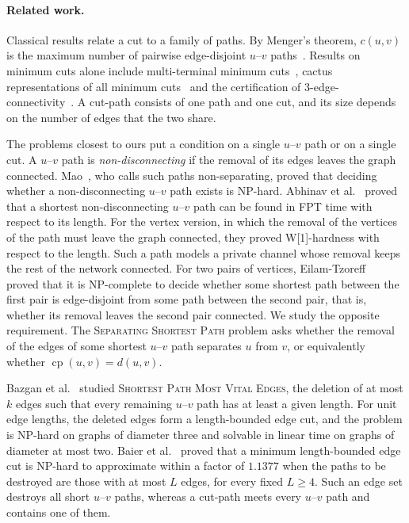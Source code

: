 \documentclass[a4paper,fleqn]{cas-sc}
\numberwithin{equation}{section}
\theoremstyle{definition}
\theoremstyle{plain}
\theoremstyle{remark}
\newcommand{\cp}{\operatorname{cp}}                  %
\newcommand{\SSP}{\textsc{Separating Shortest Path}}
\begin{document}
\paragraph{Related work.}
Classical results relate a cut to a family of paths.
By Menger's theorem, $c(u,v)$ is the maximum number of pairwise edge-disjoint $u$--$v$ paths~\cite[Corollary~3.3.5]{Diestel2025}.
Results on minimum cuts alone include multi-terminal minimum cuts~\cite{GomoryHu1961}, cactus representations of all minimum cuts~\cite{NagamochiKameda1996} and the certification of 3-edge-connectivity~\cite{Mehlhorn2017Certifying}.
A cut-path consists of one path and one cut, and its size depends on the number of edges that the two share.

The problems closest to ours put a condition on a single $u$--$v$ path or on a single cut.
A $u$--$v$ path is \emph{non-disconnecting} if the removal of its edges leaves the graph connected.
Mao~\cite{Mao2021NonSeparating}, who calls such paths non-separating, proved that deciding whether a non-disconnecting $u$--$v$ path exists is NP-hard.
Abhinav et al.~\cite{Abhinav2022NonSeparating} proved that a shortest non-disconnecting $u$--$v$ path can be found in FPT time with respect to its length.
For the vertex version, in which the removal of the vertices of the path must leave the graph connected, they proved W[1]-hardness with respect to the length.
Such a path models a private channel whose removal keeps the rest of the network connected.
For two pairs of vertices, Eilam-Tzoreff~\cite{EilamTzoreff1998Disjoint} proved that it is NP-complete to decide whether some shortest path between the first pair is edge-disjoint from some path between the second pair, that is, whether its removal leaves the second pair connected.
We study the opposite requirement.
The \SSP{} problem asks whether the removal of the edges of some shortest $u$--$v$ path separates $u$ from $v$, or equivalently whether $\cp(u,v) = d(u,v)$.

Bazgan et al.~\cite{Bazgan2019MostVital} studied \textsc{Shortest Path Most Vital Edges}, the deletion of at most $k$ edges such that every remaining $u$--$v$ path has at least a given length.
For unit edge lengths, the deleted edges form a length-bounded edge cut, and the problem is NP-hard on graphs of diameter three and solvable in linear time on graphs of diameter at most two.
Baier et al.~\cite{Baier2010LengthBounded} proved that a minimum length-bounded edge cut is NP-hard to approximate within a factor of $1.1377$ when the paths to be destroyed are those with at most $L$ edges, for every fixed $L \geq 4$.
Such an edge set destroys all short $u$--$v$ paths, whereas a cut-path meets every $u$--$v$ path and contains one of them.
\end{document}

